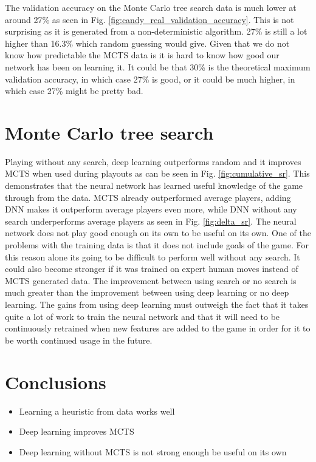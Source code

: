 \documentclass{kththesis}
\begin{document}
The validation accuracy on the Monte Carlo tree search data is much lower at around 27\% as seen in Fig. \ref{fig:candy_real_validation_accuracy}. This is not surprising as  it is generated from a non-deterministic algorithm. 27\% is still a lot higher than 16.3\% which random guessing would give. Given that we do not know how predictable the MCTS data is it is hard to know how good our network has been on learning it. It could be that 30\% is the theoretical maximum validation accuracy, in which case 27\% is good, or it could be much higher, in which case 27\% might be pretty bad. 

\section{Monte Carlo tree search}
Playing without any search, deep learning outperforms random and it improves MCTS when used during playouts as can be seen in Fig. \ref{fig:cumulative_sr}.  This demonstrates  that the neural network has learned useful knowledge of the game through from the data.  MCTS already outperformed average players, adding DNN makes it outperform average players even more, while DNN without any search underperforms average players as seen in Fig. \ref{fig:delta_sr}.  The neural network does not play  good enough on its own to be useful on its own. One of the problems with the training data is that it does not include goals of the game. For this reason alone its going to be difficult to perform well without any search.  It could also become stronger if it was trained on expert human moves instead of MCTS generated data. The improvement between using search or no search is much greater than the improvement between using deep learning or no deep learning. The gains from using deep learning must outweigh the fact that it takes quite a lot of work to train the neural network and that it will need to be continuously retrained when new features are added to the game in order for it to be worth continued usage in the future.

\section{Conclusions}
\begin{itemize}
\item Learning a heuristic from data works well
\item  Deep learning improves MCTS
\item  Deep learning without MCTS is not strong enough be useful on its own 
\end{itemize}
\end{document}
